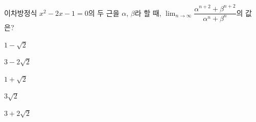 이차방정식 $x^2-2x-1=0$의 두 근을 $\alpha$, $\beta$라 할 때, $\displaystyle\lim_{n\to\infty}\dfrac{\alpha^{n+2}+\beta^{n+2}}{\alpha^n+\beta^n}$의 값은?
\begin{choices32}{\rule[-3ex]{0pt}{8ex}$1-\sqrt{2}$}{\rule[-3ex]{0pt}{8ex}$3-2\sqrt{2}$}{\rule[-3ex]{0pt}{8ex}$1+\sqrt{2}$}{\rule[-3ex]{0pt}{8ex}$3\sqrt{2}$}{\rule[-3ex]{0pt}{8ex}$3+2\sqrt{2}$}\end{choices32}
